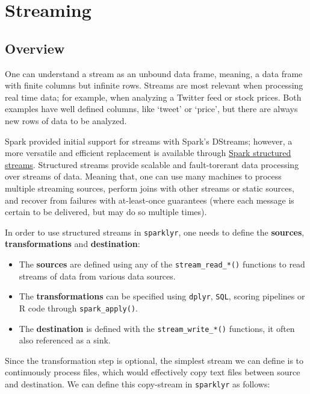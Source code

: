 \documentclass[]{book}
\providecommand{\tightlist}{%
  \setlength{\itemsep}{0pt}\setlength{\parskip}{0pt}}
\theoremstyle{definition}
\theoremstyle{definition}
\theoremstyle{definition}
\theoremstyle{remark}
\begin{document}
\hypertarget{streaming}{%
\chapter{Streaming}\label{streaming}}

\hypertarget{overview-4}{%
\section{Overview}\label{overview-4}}

One can understand a stream as an unbound data frame, meaning, a data
frame with finite columns but infinite rows. Streams are most relevant
when processing real time data; for example, when analyzing a Twitter
feed or stock prices. Both examples have well defined columns, like
`tweet' or `price', but there are always new rows of data to be
analyzed.

Spark provided initial support for streams with Spark's DStreams;
however, a more versatile and efficient replacement is available through
\href{https://spark.apache.org/docs/latest/structured-streaming-programming-guide.html}{Spark
structured streams}. Structured streams provide scalable and
fault-torerant data processing over streams of data. Meaning that, one
can use many machines to process multiple streaming sources, perform
joins with other streams or static sources, and recover from failures
with at-least-once guarantees (where each message is certain to be
delivered, but may do so multiple times).

In order to use structured streams in \texttt{sparklyr}, one needs to
define the \textbf{sources}, \textbf{transformations} and
\textbf{destination}:

\begin{itemize}
\tightlist
\item
  The \textbf{sources} are defined using any of the
  \texttt{stream\_read\_*()} functions to read streams of data from
  various data sources.
\item
  The \textbf{transformations} can be specified using \texttt{dplyr},
  \texttt{SQL}, scoring pipelines or R code through
  \texttt{spark\_apply()}.
\item
  The \textbf{destination} is defined with the
  \texttt{stream\_write\_*()} functions, it often also referenced as a
  sink.
\end{itemize}

Since the transformation step is optional, the simplest stream we can
define is to continuously process files, which would effectively copy
text files between source and destination. We can define this
copy-stream in \texttt{sparklyr} as follows:
\end{document}
